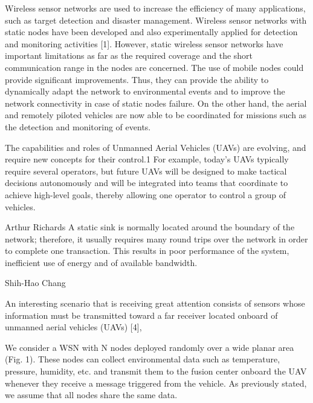 Wireless sensor networks are used to increase the
efficiency of many applications, such as target detection and
disaster management. Wireless sensor networks with static
nodes have been developed and also experimentally applied
for detection and monitoring activities [1]. However, static
wireless sensor networks have important limitations as far as
the required coverage and the short communication range in
the nodes are concerned. The use of mobile nodes could
provide significant improvements. Thus, they can provide the
ability to dynamically adapt the network to environmental
events and to improve the network connectivity in case of
static nodes failure. On the other hand, the aerial and
remotely piloted vehicles are now able to be coordinated for
missions such as the detection and monitoring of events.

\cite{Aware}
The capabilities and roles of Unmanned Aerial Vehicles
(UAVs) are evolving, and require new concepts
for their control.1 For example, today’s UAVs typically
require several operators, but future UAVs will
be designed to make tactical decisions autonomously
and will be integrated into teams that coordinate to
achieve high-level goals, thereby allowing one operator
to control a group of vehicles.

Arthur Richards
A static sink is normally located
around the boundary of the network; therefore, it
usually requires many round trips over the network in
order to complete one transaction. This results in poor
performance of the system, inefficient use of energy
and of available bandwidth.

Shih-Hao Chang




An interesting scenario that is receiving great attention
consists of sensors whose information must be transmitted toward a far receiver located onboard of unmanned
aerial vehicles (UAVs) [4],

We consider a WSN with N nodes deployed randomly over a wide planar area (Fig. 1). These nodes can collect
environmental data such as temperature, pressure, humidity, etc. and transmit them to the fusion center onboard
the UAV whenever they receive a message triggered from the vehicle. As previously stated, we assume that all
nodes share the same data.

